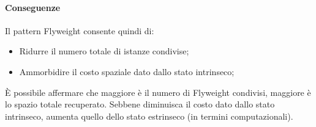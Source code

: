 \paragraph{Conseguenze} Il pattern Flyweight consente quindi di:
\begin{itemize}
    \item Ridurre il numero totale di istanze condivise;
    \item Ammorbidire il costo spaziale dato dallo stato intrinseco;
\end{itemize}
È possibile affermare che maggiore è il numero di Flyweight condivisi, maggiore è lo spazio totale recuperato. Sebbene diminuisca il costo dato dallo stato intrinseco, aumenta quello dello stato estrinseco (in termini computazionali).



\newpage
